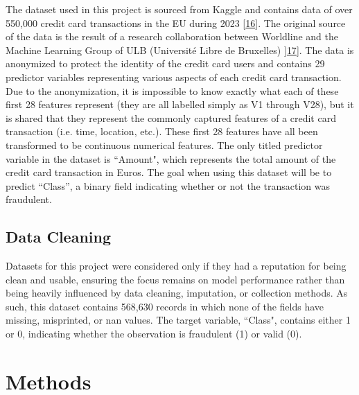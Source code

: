 \documentclass[11pt, oneside]{article}   	%
\begin{document}
\hspace{10mm}The dataset used in this project is sourced from Kaggle and contains data of over 550,000 credit card transactions in the EU during 2023 [\href{https://www.kaggle.com/datasets/nelgiriyewithana/credit-card-fraud-detection-dataset-2023}{16}]. The original source of the data is the result of a research collaboration between Worldline and the Machine Learning Group of ULB (Université Libre de Bruxelles) ]\href{https://www.researchgate.net/publication/283349138_Calibrating_Probability_with_Undersampling_for_Unbalanced_Classification}{17}]. The data is anonymized to protect the identity of the credit card users and contains 29 predictor variables representing various aspects of each credit card transaction.  Due to the anonymization, it is impossible to know exactly what each of these first 28 features represent (they are all labelled simply as V1 through V28), but it is shared that they represent the commonly captured features of a credit card transaction (i.e. time, location, etc.). These first 28 features have all been transformed to be continuous numerical features. The only titled predictor variable in the dataset is ``Amount", which represents the total amount of the credit card transaction in Euros. The goal when using this dataset will be to predict ``Class”, a binary field indicating whether or not the transaction was fraudulent.

\subsection{Data Cleaning}

\hspace{10mm}Datasets for this project were considered only if they had a reputation for being clean and usable, ensuring the focus remains on model performance rather than being heavily influenced by data cleaning, imputation, or collection methods. As such, this dataset contains 568,630 records in which none of the fields have missing, misprinted, or nan values. The target variable, ``Class", contains either 1 or 0, indicating whether the observation is fraudulent (1) or valid (0). \\
	



\section{Methods}
\end{document}
